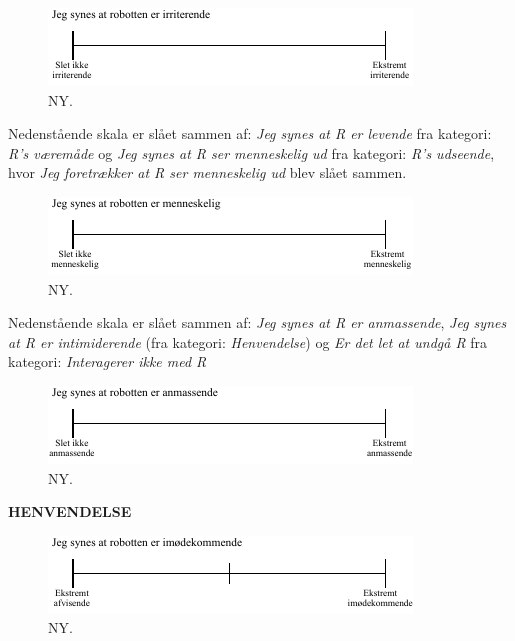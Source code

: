\noindent
%
%
\begin{figure}[H]
\centering
\includegraphics[width =\textwidth]{Figure/UdvalgteSkalaer/Irriterende} 
\caption{NY.}
\label{fig:SkalaIrriterende}
\end{figure}
\noindent
%
Nedenstående skala er slået sammen af: \textit{Jeg synes at R er levende} fra kategori: \textit{R's væremåde} og \textit{Jeg synes at R ser menneskelig ud} fra kategori: \textit{R's udseende}, hvor \textit{Jeg foretrækker at R ser menneskelig ud} blev slået sammen.
%
\begin{figure}[H]
\centering
\includegraphics[width =\textwidth]{Figure/UdvalgteSkalaer/MenneskeligR} 
\caption{NY.}
\label{fig:SkalaMenneskeligR}
\end{figure}
\noindent
%
Nedenstående skala er slået sammen af: \textit{Jeg synes at R er anmassende}, \textit{Jeg synes at R er intimiderende} (fra kategori: \textit{Henvendelse}) og \textit{Er det let at undgå R} fra kategori: \textit{Interagerer ikke med R} 
%
\begin{figure}[H]
\centering
\includegraphics[width =\textwidth]{Figure/UdvalgteSkalaer/Anmassende} 
\caption{NY.}
\label{fig:SkalaAnmassende}
\end{figure}
\noindent
%
\textbf{HENVENDELSE}\\
%
\begin{figure}[H]
\centering
\includegraphics[width =\textwidth]{Figure/UdvalgteSkalaer/Imoedekommende} 
\caption{NY.}
\label{fig:SkalaImoedekommende}
\end{figure}
